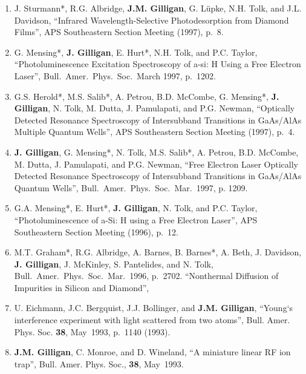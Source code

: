 \begin{enumerate}
\item
  J. Sturmann*, R.G. Albridge, \textbf{J.M. Gilligan}, G. L\"upke, N.H. Tolk, and J.L. Davidson,
  \enquote{Infrared Wavelength-Selective Photodesorption from Diamond Films},
  APS Southeastern Section Meeting (1997), p.~8.

\item
  G. Mensing*, \textbf{J. Gilligan}, E. Hurt*, N.H. Tolk, and P.C. Taylor,
  \enquote{Photoluminescence Excitation Spectroscopy of a-si: H Using a Free Electron Laser},
Bull.\ Amer.\ Phys.\ Soc.\ March 1997, p.~1202.

\item
  G.S. Herold*, M.S. Salib*, A. Petrou, B.D. McCombe, G. Mensing*, \textbf{J. Gilligan}, N. Tolk, M. Dutta, J. Pamulapati, and P.G. Newman,
  \enquote{Optically Detected Resonance Spectroscopy of Intersubband Transitions in GaAs/AlAs Multiple Quantum Wells},
  APS Southeastern Section Meeting (1997), p.~4.

\item
  \textbf{J. Gilligan}, G. Mensing*, N. Tolk, M.S. Salib*, A. Petrou, B.D. McCombe, M. Dutta, J. Pamulapati, and P.G. Newman,
  \enquote{Free Electron Laser Optically Detected Resonance Spectroscopy of Intersubband Transitions in GaAs/AlAs Quantum Wells}, 
  Bull.\ Amer.\ Phys.\ Soc.\ Mar.~1997, p. 1209.

\item
  G.A. Mensing*, E. Hurt*, \textbf{J. Gilligan}, N. Tolk, and P.C. Taylor,
  \enquote{Photoluminescence of a-Si: H using a Free Electron Laser},
  APS Southeastern Section Meeting (1996), p.~12.


\item
  M.T. Graham*, R.G. Albridge, A. Barnes, B. Barnes*, A. Beth, J. Davidson, \textbf{J. Gilligan}, J. McKinley, S. Pantelides, and N. Tolk, Bull.\ Amer.\ Phys.\ Soc.\ Mar.~1996, p.~2702.
  \enquote{Nonthermal Diffusion of Impurities in Silicon and Diamond},
  
 \item
 U. Eichmann, J.C. Bergquist, J.J. Bollinger, and \textbf{J.M. Gilligan},
 \enquote{Young`s interference experiment with light scattered from two atoms},
 Bull. Amer. Phys. Soc. \textbf{38}, May~1993, p.~1140 (1993).

\item
 \textbf{J.M. Gilligan}, C. Monroe, and D. Wineland,
  \enquote{A miniature linear RF ion trap},
  Bull. Amer. Phys. Soc., \textbf{38}, May~1993.
\end{enumerate}
